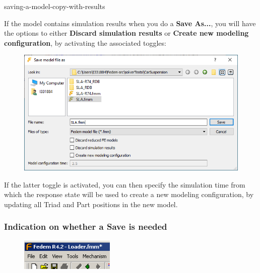 
              {saving-a-model-copy-with-results}

If the model contains simulation results when you do a \textbf{Save As...},
you will have the options to either \textbf{Discard simulation results} or
\textbf{Create new modeling configuration}, by activating the
associated toggles:

\begin{figure}[H]
  \center\includegraphics[scale=0.6]{Figures/Dialogs/2-SaveAsUpdated}
\end{figure}

If the latter toggle is activated, you can then specify the simulation
time from which the response state will be used to create a
new modeling configuration, by updating all Triad and Part
positions in the new model.

\subsubsection{Indication on whether a Save is needed}

\begin{figure}
  \includegraphics[width=0.4\textwidth]{Figures/2-TitleWithAsterisk}
\end{figure}

